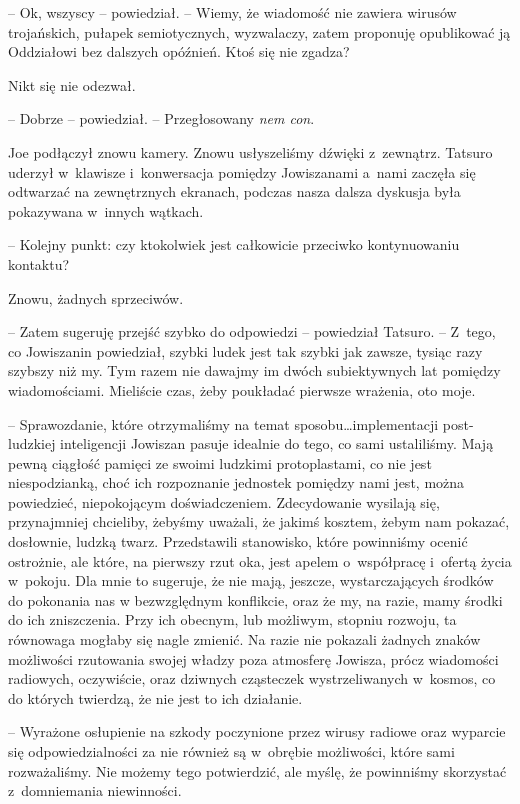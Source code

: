 \documentclass[oneside,polish,11pt,sfheadings]{mwbk}
\begin{document}
-- Ok, wszyscy -- powiedział. -- Wiemy, że wiadomość nie zawiera wirusów
trojańskich, pułapek semiotycznych, wyzwalaczy, zatem proponuję
opublikować ją Oddziałowi bez dalszych opóźnień. Ktoś się nie zgadza?

Nikt się nie odezwał.

-- Dobrze -- powiedział. -- Przegłosowany \textit{nem con}.

Joe podłączył znowu kamery. Znowu usłyszeliśmy dźwięki z~zewnątrz.
Tatsuro uderzył w~klawisze i~konwersacja pomiędzy Jowiszanami a~nami
zaczęła się odtwarzać na zewnętrznych ekranach, podczas nasza dalsza
dyskusja była pokazywana w~innych wątkach.

-- Kolejny punkt: czy ktokolwiek jest całkowicie przeciwko kontynuowaniu
kontaktu?

Znowu, żadnych sprzeciwów.

-- Zatem sugeruję przejść szybko do odpowiedzi -- powiedział Tatsuro. -- Z~tego, co Jowiszanin powiedział, szybki ludek jest tak szybki jak zawsze,
tysiąc razy szybszy niż my. Tym razem nie dawajmy im dwóch subiektywnych
lat pomiędzy wiadomościami. Mieliście czas, żeby poukładać pierwsze
wrażenia, oto moje.

-- Sprawozdanie, które otrzymaliśmy na temat sposobu\ldots  implementacji
post-ludzkiej inteligencji Jowiszan pasuje idealnie do tego, co sami
ustaliliśmy. Mają pewną ciągłość pamięci ze swoimi ludzkimi
protoplastami, co nie jest niespodzianką, choć ich rozpoznanie jednostek
pomiędzy nami jest, można powiedzieć, niepokojącym doświadczeniem.
Zdecydowanie wysilają się, przynajmniej chcieliby, żebyśmy uważali, że
jakimś kosztem, żebym nam pokazać, dosłownie, ludzką twarz. Przedstawili
stanowisko, które powinniśmy ocenić ostrożnie, ale które, na pierwszy
rzut oka, jest apelem o~współpracę i~ofertą życia w~pokoju. Dla mnie to
sugeruje, że nie mają, jeszcze, wystarczających środków do pokonania nas
w bezwzględnym konflikcie, oraz że my, na razie, mamy środki do ich
zniszczenia. Przy ich obecnym, lub możliwym, stopniu rozwoju, ta
równowaga mogłaby się nagle zmienić. Na razie nie pokazali żadnych
znaków możliwości rzutowania swojej władzy poza atmosferę Jowisza, prócz
wiadomości radiowych, oczywiście, oraz dziwnych cząsteczek
wystrzeliwanych w~kosmos, co do których twierdzą, że nie jest to ich
działanie.

-- Wyrażone osłupienie na szkody poczynione przez wirusy radiowe oraz
wyparcie się odpowiedzialności za nie również są w~obrębie możliwości,
które sami rozważaliśmy. Nie możemy tego potwierdzić, ale myślę, że
powinniśmy skorzystać z~domniemania niewinności.
\end{document}
